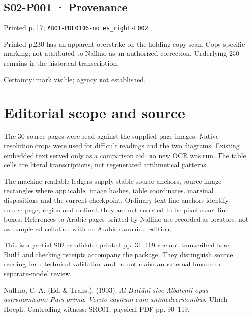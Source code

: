 \documentclass[11pt]{article}
\begin{document}
\subsection*{S02-P001 · Provenance}
{\small Printed p. 17; \texttt{AB01-PDF0106-notes\_right-L002}\par}
Printed p.230 has an apparent overstrike on the holding-copy scan. Copy-specific marking; not attributed to Nallino as an authorized correction. Underlying 230 remains in the historical transcription.
{\small Certainty: mark visible; agency not established.\par}
\section*{Editorial scope and source}
The 30 source pages were read against the supplied page images. Native-resolution crops were used for difficult readings and the two diagrams. Existing embedded text served only as a comparison aid; no new OCR was run. The table cells are literal transcriptions, not regenerated arithmetical patterns.

The machine-readable ledgers supply stable source anchors, source-image rectangles where applicable, image hashes, table coordinates, marginal dispositions and the current checkpoint. Ordinary text-line anchors identify source page, region and ordinal; they are not asserted to be pixel-exact line boxes. References to Arabic pages printed by Nallino are recorded as locators, not as completed collation with an Arabic canonical edition.

This is a partial S02 candidate: printed pp. 31–109 are not transcribed here. Build and checking receipts accompany the package. They distinguish source reading from technical validation and do not claim an external human or separate-model review.

\medskip
{\small Nallino, C. A. (Ed. \& Trans.). (1903). \textit{Al-Battānī sive Albatenii opus astronomicum: Pars prima. Versio capitum cum animadversionibus}. Ulrich Hoepli. Controlling witness: SRC01, physical PDF pp. 90–119.\par}
\end{document}
